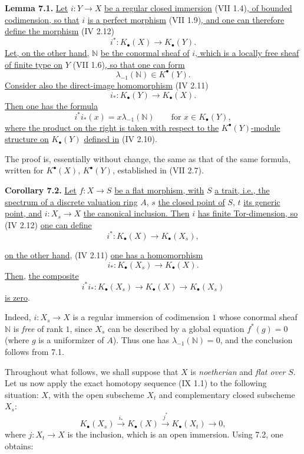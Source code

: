 \textbf{Lemma 7.1.} \uline{Let} \(i:Y\to X\) \uline{be a regular closed immersion} (VII 1.4)\uline{, of bounded codimension, so that} \(i\) \uline{is a perfect morphism} (VII 1.9)\uline{, and one can therefore define the morphism} (IV 2.12)
\[
 i^*:K_\bullet(X)\longrightarrow K_\bullet(Y).
\]
\uline{Let, on the other hand,} \(\mathbb N\) \uline{be the conormal sheaf of} \(i\)\uline{, which is a locally free sheaf of finite type on} \(Y\) (VII 1.6)\uline{, so that one can form}
\[
 \lambda_{-1}(\mathbb N)\in K^{\bullet}(Y).
\]
\uline{Consider also the direct-image homomorphism} (IV 2.11)
\[
 i_*:K_\bullet(Y)\longrightarrow K_\bullet(X).
\]
\uline{Then one has the formula}
\[
 i^*i_*(x)=x\lambda_{-1}(\mathbb N)\qquad\text{for } x\in K_\bullet(Y),
\]
\uline{where the product on the right is taken with respect to the} \(K^{\bullet}(Y)\)\uline{-module structure on} \(K_\bullet(Y)\) \uline{defined in} (IV 2.10).

The proof is, essentially without change, the same as that of the same formula, written for \(K^{\bullet}(X)\), \(K^{\bullet}(Y)\), established in (VII 2.7).

\textbf{Corollary 7.2.} \uline{Let} \(f:X\to S\) \uline{be a flat morphism, with} \(S\) \uline{a trait, i.e., the spectrum of a discrete valuation ring} \(A\), \(s\) \uline{the closed point of} \(S\), \(t\) \uline{its generic point, and} \(i:X_s\to X\) \uline{the canonical inclusion. Then} \(i\) \uline{has finite Tor-dimension, so} (IV 2.12) \uline{one can define}
\[
 i^*:K_\bullet(X)\longrightarrow K_\bullet(X_s),
\]

%

\uline{on the other hand}, (IV 2.11) \uline{one has a homomorphism}
\[
 i_*:K_\bullet(X_s)\longrightarrow K_\bullet(X).
\]
\uline{Then}, \uline{the composite}
\[
 i^*i_*:K_\bullet(X_s)\longrightarrow K_\bullet(X)\longrightarrow K_\bullet(X_s)
\]
\uline{is zero}.

Indeed, \(i:X_s\to X\) is a regular immersion of codimension \(1\) whose conormal sheaf \(\mathbb N\) is \emph{free} of rank \(1\), since \(X_s\) can be described by a global equation \(f^*(g)=0\) (where \(g\) is a uniformizer of \(A\)). Thus one has \(\lambda_{-1}(\mathbb N)=0\), and the conclusion follows from 7.1.

Throughout what follows, we shall suppose that \(X\) is \emph{noetherian} and \emph{flat over} \(S\). Let us now apply the exact homotopy sequence (IX 1.1) to the following situation: \(X\), with the open subscheme \(X_t\) and complementary closed subscheme \(X_s\):
\[
K_\bullet(X_s)\xrightarrow{i_*}K_\bullet(X)\xrightarrow{j^*}K_\bullet(X_t)\longrightarrow0,
\]
where \(j:X_t\to X\) is the inclusion, which is an open immersion. Using 7.2, one obtains:

